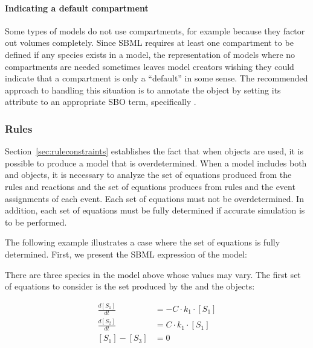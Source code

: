 \paragraph{Indicating a default compartment}

Some types of models do not use compartments, for example because
they factor out volumes completely.  Since SBML requires at least
one compartment to be defined if any species exists in a model, the
representation of models where no compartments are needed
sometimes leaves model creators wishing they could indicate that a
compartment is only a ``default'' in some sense.  The recommended
approach to handling this situation is to annotate the
\Compartment object by setting its  attribute to an
appropriate SBO term, specifically .


\subsubsection{Rules}
\label{sec:bp:rules}

Section~\ref{sec:ruleconstraints} establishes the fact that when
\AlgebraicRule objects are used, it is possible to produce a model
that is overdetermined.  When a model includes both \Event and
\Reaction objects, it is necessary to analyze the set of equations
produced from the rules and reactions and the set of equations
produces from rules and the event assignments of each event.  Each
set of equations must not be overdetermined.  In addition, each
set of equations must be fully determined if accurate simulation
is to be performed.

The following example illustrates a case where the set of
equations is fully determined.  First, we present the SBML
expression of the model:

\vspace*{2ex}

There are three species in the model above whose values may vary.
The first set of equations to consider is the set produced by the
\Reaction and the \AlgebraicRule objects:
\begin{linenomath}
\begin{align*}
  \frac{d [S_1]}{d t} &= - C \cdot k_1 \cdot [S_1] \\[2pt]
  \frac{d [S_2]}{d t} &= C \cdot k_1 \cdot [S_1]   \\[2pt]
  [S_1] - [S_3]       &= 0
\end{align*}
\end{linenomath}

